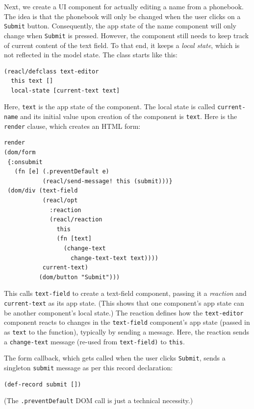 \documentclass[sigplan,screen]{acmart}
\begin{document}
Next, we create a UI component for actually editing a name from a
phonebook.  The idea is that the phonebook will only be changed when
the user clicks on a \texttt{Submit} button.  Consequently, the app
state of the name component will only
change when \texttt{Submit} is pressed.  However, the component still
needs to keep track of current content of the text field.  To that
end, it keeps a \textit{local state}, which is not reflected in the
model state.  The class starts like this:
%
\begin{verbatim}
(reacl/defclass text-editor
  this text []
  local-state [current-text text]
\end{verbatim}
%
Here, \texttt{text} is the app state of the component.  The local
state is called \texttt{current-name} and its initial value upon
creation of the component is \texttt{text}.  Here is the
\texttt{render} clause, which creates an HTML form:
%
\begin{verbatim}
render
(dom/form
 {:onsubmit
   (fn [e] (.preventDefault e)
           (reacl/send-message! this (submit)))}
 (dom/div (text-field
           (reacl/opt
             :reaction
             (reacl/reaction
               this
               (fn [text]
                 (change-text
                   change-text-text text))))
           current-text)
          (dom/button "Submit")))
\end{verbatim}
%
This calls \texttt{text-field} to create a text-field component,
passing it a \textit{reaction} and \texttt{current-text} as its app
state.  (This shows that one component's app state can be another
component's local state.)  The reaction defines how the
\texttt{text-editor} component reacts to changes in the
\texttt{text-field} component's app state (passed in as \texttt{text}
to the function), typically by sending a message.  Here, the reaction
sends a \texttt{change-text} message (re-used from
\texttt{text-field)} to \texttt{this}.

The form callback, which gets called when the user clicks
\texttt{Submit}, sends a singleton \texttt{submit} message as per this
record declaration:
%
\begin{verbatim}
(def-record submit [])
\end{verbatim}
%
(The \texttt{.preventDefault} DOM call is just a technical necessity.)
\end{document}
